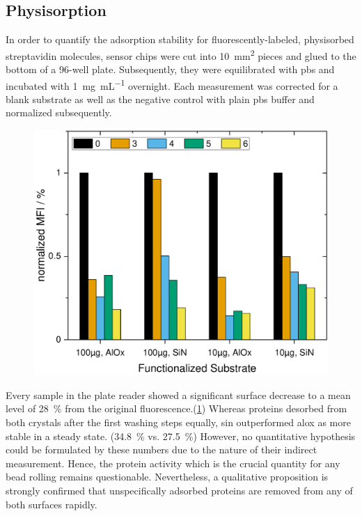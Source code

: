 \subsection{Physisorption}
\label{sec:res:physis}
In order to quantify the adsorption stability for fluorescently-labeled, physisorbed streptavidin molecules, sensor chips were cut into \SI{10}{\milli\meter\squared} pieces and glued to the bottom of a 96-well plate. Subsequently, they were equilibrated with \gls{pbs} and incubated with \SI{1}{\milli\gram\per\milli\liter} overnight. Each measurement was corrected for a blank substrate as well as the negative control with plain \gls{pbs} buffer and normalized subsequently.

\begin{figure}[h!]
	\centering
	\includegraphics[width=.7\linewidth]{Ressources/ResultPlots/SurfaceFuncSiNAlOx}
	\label{fig:unsp:wash}
\end{figure}
Every sample in the plate reader showed a significant surface decrease to a mean level of \SI{28}{\percent} from the original fluorescence.(\cref{fig:unsp:wash}) Whereas proteins desorbed from both crystals after the first washing steps equally, \gls{sin} outperformed \gls{alox} as more stable in a steady state. (\SI{34.8}{\percent} vs. \SI{27.5}{\percent}) However, no quantitative hypothesis could be formulated by these numbers due to the nature of their indirect measurement. Hence, the protein activity which is the crucial quantity for any bead rolling remains questionable. Nevertheless, a qualitative proposition is strongly confirmed that unspecifically adsorbed proteins are removed from any of both surfaces rapidly.

